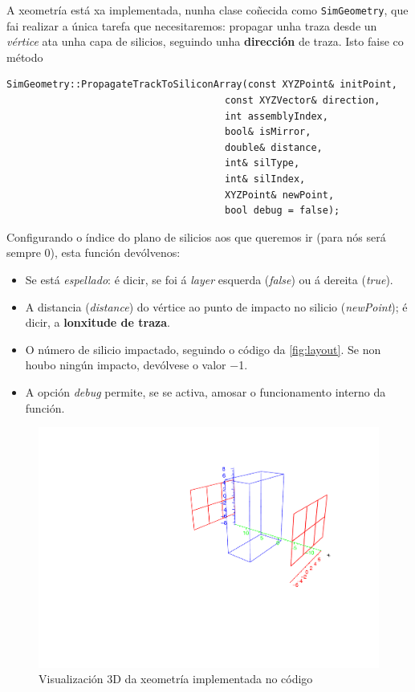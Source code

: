 \documentclass[11pt, a4paper]{article}
\begin{document}
A xeometría está xa implementada, nunha clase coñecida como \lstinline{SimGeometry}, que fai realizar a única tarefa que necesitaremos: propagar unha traza desde un \textit{vértice} ata unha capa de silicios, seguindo unha \textbf{dirección} de traza. Isto faise co método
\begin{lstlisting}[caption=Interface á function de propagación de traza, label={lst:geometry}]
    SimGeometry::PropagateTrackToSiliconArray(const XYZPoint& initPoint,
                                      const XYZVector& direction,
                                      int assemblyIndex,
                                      bool& isMirror,
                                      double& distance,
                                      int& silType,
                                      int& silIndex,
                                      XYZPoint& newPoint,
                                      bool debug = false);
\end{lstlisting}
Configurando o índice do plano de silicios aos que queremos ir (para nós será sempre 0), esta función devólvenos:
\begin{itemize}
    \item Se está \textit{espellado}: é dicir, se foi á \textit{layer} esquerda (\textit{false}) ou á dereita (\textit{true}).
    \item A distancia (\textit{distance}) do vértice ao punto de impacto no silicio (\textit{newPoint}); é dicir, a \textbf{lonxitude de traza}.
    \item O número de silicio impactado, seguindo o código da \autoref{fig:layout}. Se non houbo ningún impacto, devólvese o valor \num{-1}.
    \item A opción \textit{debug} permite, se se activa, amosar o funcionamento interno da función.
\end{itemize}

\begin{figure}[!ht]
    \centering
    \includegraphics[width=0.7\linewidth]{figures/geo0.pdf}
    \caption{Visualización 3D da xeometría implementada no código}
    \label{fig:geo0}
\end{figure}
\end{document}
